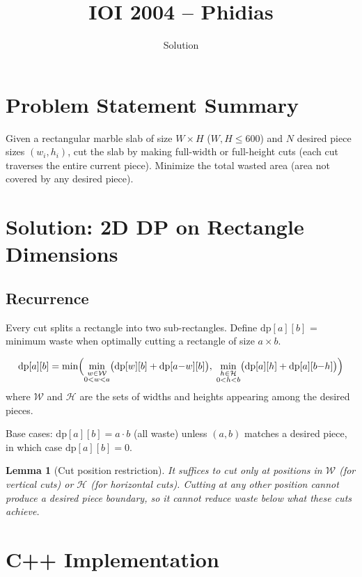 \documentclass[11pt,a4paper]{article}
\title{IOI 2004 -- Phidias}
\author{Solution}
\date{}
\newtheorem{lemma}[theorem]{Lemma}
\begin{document}
\maketitle

\section{Problem Statement Summary}
Given a rectangular marble slab of size $W \times H$ ($W, H \le 600$)
and $N$ desired piece sizes $(w_i, h_i)$, cut the slab by making
full-width or full-height cuts (each cut traverses the entire current
piece). Minimize the total wasted area (area not covered by any desired
piece).

\section{Solution: 2D DP on Rectangle Dimensions}

\subsection{Recurrence}
Every cut splits a rectangle into two sub-rectangles. Define
$\mathrm{dp}[a][b]$ = minimum waste when optimally cutting a rectangle
of size $a \times b$.

\[
  \mathrm{dp}[a][b] = \min\Bigl(
    \min_{\substack{w \in \mathcal{W} \\ 0 < w < a}}
      \bigl(\mathrm{dp}[w][b] + \mathrm{dp}[a{-}w][b]\bigr),\;
    \min_{\substack{h \in \mathcal{H} \\ 0 < h < b}}
      \bigl(\mathrm{dp}[a][h] + \mathrm{dp}[a][b{-}h]\bigr)
  \Bigr)
\]
where $\mathcal{W}$ and $\mathcal{H}$ are the sets of widths and
heights appearing among the desired pieces.

Base cases: $\mathrm{dp}[a][b] = a \cdot b$ (all waste) unless
$(a, b)$ matches a desired piece, in which case $\mathrm{dp}[a][b] = 0$.

\begin{lemma}[Cut position restriction]
It suffices to cut only at positions in $\mathcal{W}$ (for vertical
cuts) or $\mathcal{H}$ (for horizontal cuts). Cutting at any other
position cannot produce a desired piece boundary, so it cannot reduce
waste below what these cuts achieve.
\end{lemma}

\section{C++ Implementation}
\end{document}
